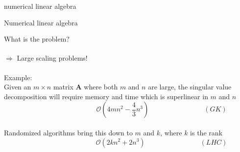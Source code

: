 \documentclass{beamer}
\newcommand{\bvec}[1]{\mathbf{#1}}
\newcommand{\vA}{\bvec{A}}
\begin{document}
\begin{frame}{numerical linear algebra}



\end{frame}


\begin{frame}{Numerical linear algebra}

What is the problem?\\
~\\
$\Rightarrow$ Large scaling problems!\\
 ~\\
Example:\\
Given an $m\times n$ matrix $\vA$ where both $m$ and $n$ are large, the singular value decomposition will require memory and time which is superlinear in $m$ and $n$\\
$$
\qquad\qquad\qquad\qquad\qquad 
\mathcal{O} (4mn^2 - \frac{4}{3}n^3)  
\qquad\qquad\qquad\qquad 
(GK)
$$
~\\
Randomized algorithms bring this down to $m$ and $k$, where $k$ is the rank
$$
\qquad\qquad\qquad\qquad\qquad 
\mathcal{O} (2kn^2 + 2n^3)
\qquad\qquad\qquad\qquad 
(LHC)
$$

\end{frame}
\end{document}
